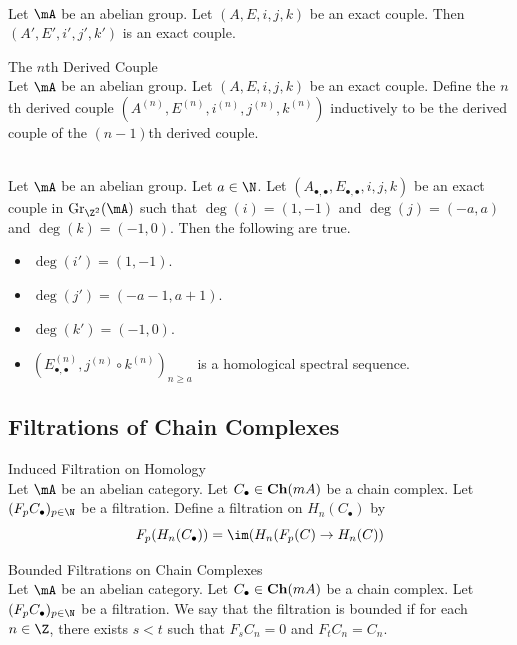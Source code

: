 \documentclass[a4paper]{article}
\begin{document}
\begin{lmm}{}{}\\
Let $\mA$ be an abelian group. Let $(A,E,i,j,k)$ be an exact couple. Then $(A',E',i',j',k')$ is an exact couple. 
\end{lmm}

\begin{defn}{The $n$th Derived Couple}{}\\
Let $\mA$ be an abelian group. Let $(A,E,i,j,k)$ be an exact couple. Define the $n$th derived couple $(A^{(n)},E^{(n)},i^{(n)},j^{(n)},k^{(n)})$ inductively to be the derived couple of the $(n-1)$th derived couple. 
\end{defn}

\begin{prp}{}{}\\
Let $\mA$ be an abelian group. Let $a\in\N$. Let $(A_{\bullet,\bullet},E_{\bullet,\bullet},i,j,k)$ be an exact couple in $\text{Gr}_{\Z^2}(\mA)$ such that $\deg(i)=(1,-1)$ and $\deg(j)=(-a,a)$ and $\deg(k)=(-1,0)$. Then the following are true. 
\begin{itemize}
\item $\deg(i')=(1,-1)$. 
\item $\deg(j')=(-a-1,a+1)$. 
\item $\deg(k')=(-1,0)$. 
\item $\left(E_{\bullet,\bullet}^{(n)},j^{(n)}\circ k^{(n)}\right)_{n\geq a}$ is a homological spectral sequence. 
\end{itemize}
\end{prp}

\subsection{Filtrations of Chain Complexes}
\begin{defn}{Induced Filtration on Homology}{}\\
Let $\mA$ be an abelian category. Let $C_\bullet\in\bold{Ch}(mA)$ be a chain complex. Let $(F_pC_\bullet)_{p\in\N}$ be a filtration. Define a filtration on $H_n(C_\bullet)$ by $$F_p(H_n(C_\bullet))=\im(H_n(F_p(C)\to H_n(C))$$
\end{defn}

\begin{defn}{Bounded Filtrations on Chain Complexes}{}{}\\
Let $\mA$ be an abelian category. Let $C_\bullet\in\bold{Ch}(mA)$ be a chain complex. Let $(F_pC_\bullet)_{p\in\N}$ be a filtration. We say that the filtration is bounded if for each $n\in\Z$, there exists $s<t$ such that $F_sC_n=0$ and $F_tC_n=C_n$. 
\end{defn}
\end{document}
